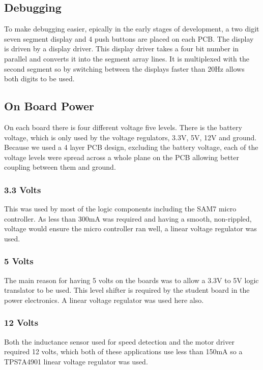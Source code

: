   \subsection{Debugging}
  To make debugging easier, epically in the early stages of development, a two
  digit seven segment display and 4 push buttons are placed on each PCB. The
  display is driven by a display driver. This display driver takes a four bit
  number in parallel and converts it into the segment array lines. It is
  multiplexed with the second segment so by switching between the displays
  faster than 20Hz allows both digits to be used.

  \subsection{On Board Power}
  On each board there is four different voltage five levels. There is the
  battery voltage, which is only used by the voltage regulators, 3.3V, 5V, 12V
  and ground. Because we used a 4 layer PCB design, excluding the battery
  voltage, each of the voltage levels were spread across a whole plane on the
  PCB allowing better coupling between them and ground.

    \subsubsection{3.3 Volts}
    This was used by most of the logic components including the SAM7 micro
    controller. As less than 300mA was required and having a smooth, non-rippled,
    voltage would ensure the micro controller ran well, a linear voltage
    regulator was used.

    \subsubsection{5 Volts}
    The main reason for having 5 volts on the boards was to allow a 3.3V to 5V
    logic translator to be used. This level shifter is required by the student
    board in the power electronics. A linear voltage regulator was used here
    also.

    \subsubsection{12 Volts}
    Both the inductance sensor used for speed detection and the motor driver
    required 12 volts, which both of these applications use less than 150mA so a
    TPS7A4901 linear voltage regulator was used\cite{TPS7A4901}.
